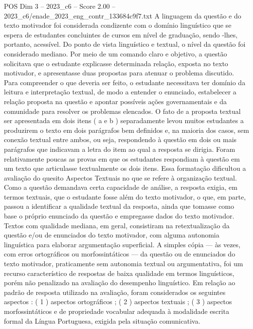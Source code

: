 \begin{textsample}{POS Dim 3 – 2023\_c6 – Score 2.00 – 2023\_c6/enade\_2023\_eng\_contr\_133684c9f7.txt}
A linguagem da questão e do texto motivador foi considerada condizente com o domínio linguístico que se espera de estudantes concluintes de cursos em nível de graduação, sendo -lhes, portanto, acessível.
Do ponto de vista linguístico e textual, o nível da questão foi considerado mediano.
Por meio de um comando claro e objetivo, a questão solicitava que o estudante explicasse determinada relação, exposta no texto motivador, e apresentasse duas propostas para atenuar o problema discutido.
Para compreender o que deveria ser feito, o estudante necessitava ter domínio da leitura e interpretação textual, de modo a entender o enunciado, estabelecer a relação proposta na questão e apontar possíveis ações governamentais e da comunidade para resolver os problemas elencados.
O fato de a proposta textual ser apresentada em dois itens ( a e b ) separadamente levou muitos estudantes a produzirem o texto em dois parágrafos bem definidos e, na maioria dos casos, sem conexão textual entre ambos, ou seja, respondendo à questão em dois ou mais parágrafos que indicavam a letra do item ao qual a resposta se dirigia.
Foram relativamente poucas as provas em que os estudantes respondiam à questão em um texto que articulasse textualmente os dois itens.
Essa formatação dificultou a avaliação do quesito Aspectos Textuais no que se refere à organização textual.
Como a questão demandava certa capacidade de análise, a resposta exigia, em termos textuais, que o estudante fosse além do texto motivador, o que, em parte, passou a identificar a qualidade textual da resposta, ainda que tomasse como base o próprio enunciado da questão e empregasse dados do texto motivador.
Textos com qualidade mediana, em geral, consistiram na retextualização da questão e/ou de enunciados do texto motivador, com alguma autonomia linguística para elaborar argumentação superficial.
A simples cópia — às vezes, com erros ortográficos ou morfossintáticos — da questão ou de enunciados do texto motivador, praticamente sem autonomia textual ou argumentativa, foi um recurso característico de respostas de baixa qualidade em termos linguísticos, porém não penalizado na avaliação do desempenho linguístico.
Em relação ao padrão de resposta utilizado na avaliação, foram considerados os seguintes aspectos : ( 1 ) aspectos ortográficos ; ( 2 ) aspectos textuais ; ( 3 ) aspectos morfossintáticos e de propriedade vocabular adequada à modalidade escrita formal da Língua Portuguesa, exigida pela situação comunicativa.

\end{textsample}
